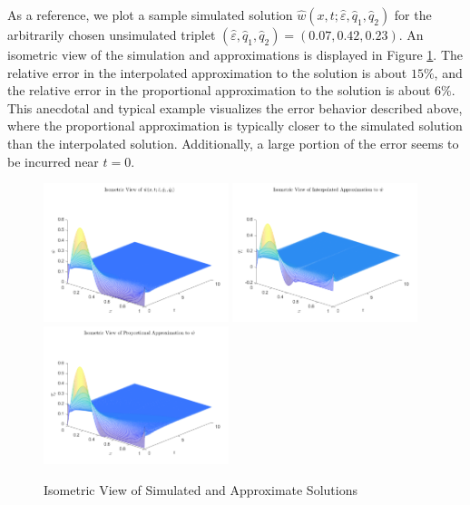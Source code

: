 \documentclass[12pt]{article}
\newcommand{\eps}{\varepsilon}
\begin{document}
    As a reference, we plot a sample simulated solution $\hat{w}(x,t;\hat{\eps},\hat{q}_1,\hat{q}_2)$ for the arbitrarily chosen unsimulated triplet $(\hat{\eps},\hat{q}_1,\hat{q}_2) = (0.07, 0.42, 0.23)$. An isometric view of the simulation and approximations is displayed in Figure \ref{fig:soln_mesh}. The relative error in the interpolated approximation to the solution is about $15\%$, and the relative error in the proportional approximation to the solution is about $6\%$. This anecdotal and typical example visualizes the error behavior described above, where the proportional approximation is typically closer to the simulated solution than the interpolated solution. Additionally, a large portion of the error seems to be incurred near $t=0$.

    \begin{figure}[t]
        \centering
        \includegraphics[width=0.48\textwidth]{figures/true_soln.pdf}
        \includegraphics[width=0.48\textwidth]{figures/interp_soln.pdf}
        \includegraphics[width=0.48\textwidth]{figures/prop_soln.pdf}
        \caption{Isometric View of Simulated and Approximate Solutions}
        \label{fig:soln_mesh}
    \end{figure}
\end{document}
